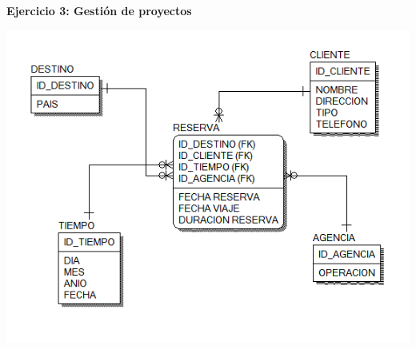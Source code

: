 \begin{flushleft}
\begin{itemize}
\textbf{ }\\
\textbf{ }\\
\textbf{ }\\
\textbf{ }\\
\textbf{ }\\
\textbf{Ejercicio 3:  Gestión de proyectos }\\
\begin{center}
	\includegraphics[width=17cm]{./Imagenes/image3} 
	\end{center}
\textbf{ }\\
\textbf{ }\\
\end{itemize} 


\end{flushleft}